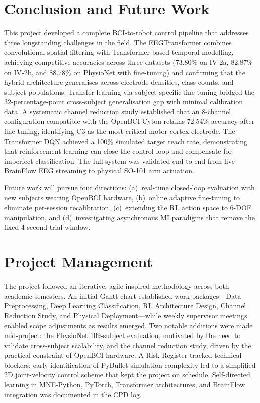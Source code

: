 \documentclass[12pt, a4paper]{article}
\begin{document}
\section{Conclusion and Future Work}

This project developed a complete BCI-to-robot control pipeline that addresses three longstanding challenges in the field. The EEGTransformer combines convolutional spatial filtering with Transformer-based temporal modelling, achieving competitive accuracies across three datasets (73.80\% on IV-2a, 82.87\% on IV-2b, and 88.78\% on PhysioNet with fine-tuning) and confirming that the hybrid architecture generalises across electrode densities, class counts, and subject populations. Transfer learning via subject-specific fine-tuning bridged the 32-percentage-point cross-subject generalisation gap with minimal calibration data. A systematic channel reduction study established that an 8-channel configuration compatible with the OpenBCI Cyton retains 72.54\% accuracy after fine-tuning, identifying C3 as the most critical motor cortex electrode. The Transformer DQN achieved a 100\% simulated target reach rate, demonstrating that reinforcement learning can close the control loop and compensate for imperfect classification. The full system was validated end-to-end from live BrainFlow EEG streaming to physical SO-101 arm actuation.

Future work will pursue four directions: (a)~real-time closed-loop evaluation with new subjects wearing OpenBCI hardware, (b)~online adaptive fine-tuning to eliminate per-session recalibration, (c)~extending the RL action space to 6-DOF manipulation, and (d)~investigating asynchronous MI paradigms that remove the fixed 4-second trial window.

\section{Project Management}

The project followed an iterative, agile-inspired methodology across both academic semesters. An initial Gantt chart established work packages---Data Preprocessing, Deep Learning Classification, RL Architecture Design, Channel Reduction Study, and Physical Deployment---while weekly supervisor meetings enabled scope adjustments as results emerged. Two notable additions were made mid-project: the PhysioNet 109-subject evaluation, motivated by the need to validate cross-subject scalability, and the channel reduction study, driven by the practical constraint of OpenBCI hardware. A Risk Register tracked technical blockers; early identification of PyBullet simulation complexity led to a simplified 2D joint-velocity control scheme that kept the project on schedule. Self-directed learning in MNE-Python, PyTorch, Transformer architectures, and BrainFlow integration was documented in the CPD log.
\end{document}
